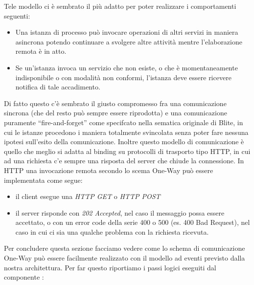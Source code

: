 Tele modello ci \`e sembrato il più adatto per poter realizzare i 
comportamenti seguenti:

\begin{itemize}
  \item Una istanza di processo può invocare operazioni di altri servizi in
  maniera asincrona potendo continuare a svolgere altre attività mentre
  l'elaborazione remota \`e in atto.
  
  \item Se un'istanza invoca un servizio che non esiste, o che \`e
  momentaneamente indisponibile o con modalità non conformi, l'istanza deve
  essere ricevere notifica di tale accadimento.
\end{itemize}

Di fatto questo c'\`e sembrato il giusto compromesso fra una comunicazione
sincrona (che del resto può sempre essere riprodotta) e una comunicazione puramente
``fire-and-forget'' come specifcato nella sematica originale di Blite, in cui le
istanze procedono i maniera totalmente svincolata senza poter fare nessuna ipotesi sull'esito della comunicazione. Inoltre questo
modello di comunicazione \`e quello che meglio si adatta al binding su
protocolli di trasporto tipo HTTP, in cui ad una richiesta c'e sempre una
risposta del server che chiude la connessione. In HTTP una invocazione remota 
secondo lo scema One-Way può essere implementata come segue:

\begin{itemize}
  \item il client esegue una \emph{HTTP GET} o \emph{HTTP POST}
  \item il server risponde con \emph{202 Accepted}, nel caso il messaggio possa
  essere accettato, o con un error code della serie 400 o 500 (es. 400 Bad
  Request), nel caso in cui ci sia una qualche problema con la richiesta
  ricevuta.
\end{itemize}


Per concludere questa sezione facciamo vedere come lo schema di comunicazione
One-Way può essere facilmente realizzato con il modello ad eventi previsto
dalla nostra architettura. Per far questo riportiamo i passi logici eseguiti
dal componente :

